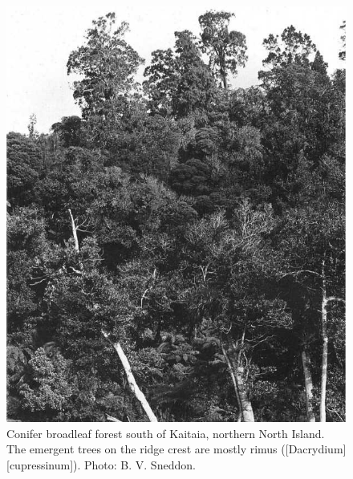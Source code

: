 \begin{figure}[!htb]
	\centering
	\begin{minipage}[t]{0.534\textwidth}
		\centering
		\includegraphics[width=\textwidth]{graphics/figure7conifer.jpg}
    	\caption[Conifer broadleaf forest south of Kaitaia]{Conifer broadleaf forest south of Kaitaia, northern North Island.
        The emergent trees on the ridge crest are mostly rimus ([Dacrydium][cupressinum]).
    	Photo: B. V. Sneddon.}%
    	\label{fig:7conifer}
	\end{minipage}\hfill%
	\begin{minipage}[t]{0.446\textwidth}
    	\centering

\end{minipage}
\end{figure}
